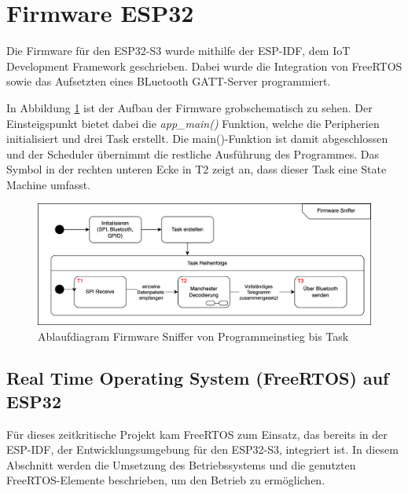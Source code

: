 

\section{Firmware ESP32}

Die Firmware für den ESP32-S3 wurde mithilfe der ESP-IDF, dem IoT Development Framework geschrieben. Dabei wurde die Integration von FreeRTOS sowie das Aufsetzten eines BLuetooth GATT-Server programmiert. 

In Abbildung \ref{fig:FSMEinleitung} ist der Aufbau der Firmware grobschematisch zu sehen. Der Einsteigspunkt bietet dabei die \textit{app\_main()} Funktion, welche die Peripherien initialisiert und drei Task erstellt. Die main()-Funktion ist damit abgeschlossen und der Scheduler übernimmt die restliche Ausführung des Programmes. Das Symbol in der rechten unteren Ecke in T2 zeigt an, dass dieser Task eine State Machine umfasst.

\begin{figure}[H]
    \centering
    \includegraphics[width=0.9\linewidth]{Figures/Chap3/ESP/Einleitung/FSM_Einleitung.png}
    \caption{Ablaufdiagram Firmware Sniffer von Programmeinstieg bis Task}
    \label{fig:FSMEinleitung}
\end{figure}

\subsection{Real Time Operating System (FreeRTOS) auf ESP32}


Für dieses zeitkritische Projekt kam FreeRTOS zum Einsatz, das bereits in der ESP-IDF, der Entwicklungsumgebung für den ESP32-S3, integriert ist. In diesem Abschnitt werden die Umsetzung des Betriebssystems und die genutzten FreeRTOS-Elemente beschrieben, um den Betrieb zu ermöglichen.

